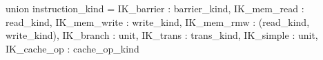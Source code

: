 union instruction_kind = {
  IK_barrier : barrier_kind,
  IK_mem_read : read_kind,
  IK_mem_write : write_kind,
  IK_mem_rmw : (read_kind, write_kind),
  IK_branch : unit,
  IK_trans : trans_kind,
  IK_simple : unit,
  IK_cache_op : cache_op_kind
}
